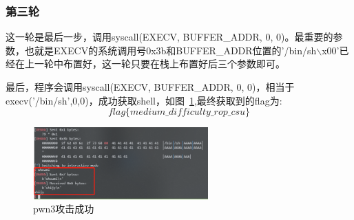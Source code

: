 \subsubsection*{第三轮}
这一轮是最后一步，调用syscall(EXECV, BUFFER\_ADDR, 0, 0)。最重要的参数，也就是EXECV的系统调用号0x3b和BUFFER\_ADDR位置的'/bin/sh$\backslash$x00'已经在上一轮中布置好，这一轮只要在栈上布置好后三个参数即可。

最后，程序会调用syscall(EXECV, BUFFER\_ADDR, 0, 0)，相当于execv('/bin/sh',0,0)，成功获取shell，如图~\ref{fig:7},最终获取到的flag为:
$$ flag\{medium\_difficulty\_rop\_csu\} $$
\begin{figure}[H]
    \centering
    \includegraphics[width=0.6\textwidth]{WP/pwn/pic/7.jpg}
    \caption{pwn3攻击成功}
    \label{fig:7}
\end{figure}